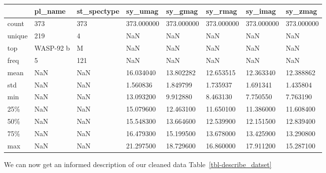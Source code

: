 \documentclass[
  letterpaper,
  DIV=11,
  numbers=noendperiod]{scrartcl}
\begin{document}
\begin{longtable}[]{@{}llllllll@{}}
\toprule\noalign{}
& pl\_name & st\_spectype & sy\_umag & sy\_gmag & sy\_rmag & sy\_imag &
sy\_zmag \\
\midrule\noalign{}
\endhead
\bottomrule\noalign{}
\endlastfoot
count & 373 & 373 & 373.000000 & 373.000000 & 373.000000 & 373.000000 &
373.000000 \\
unique & 219 & 4 & NaN & NaN & NaN & NaN & NaN \\
top & WASP-92 b & M & NaN & NaN & NaN & NaN & NaN \\
freq & 5 & 121 & NaN & NaN & NaN & NaN & NaN \\
mean & NaN & NaN & 16.034040 & 13.802282 & 12.653515 & 12.363340 &
12.388862 \\
std & NaN & NaN & 1.560836 & 1.849799 & 1.735937 & 1.691341 &
1.435804 \\
min & NaN & NaN & 13.093200 & 9.912880 & 8.463130 & 7.750550 &
7.763190 \\
25\% & NaN & NaN & 15.079600 & 12.463100 & 11.650100 & 11.386000 &
11.608400 \\
50\% & NaN & NaN & 15.548300 & 13.664600 & 12.539900 & 12.151500 &
12.839400 \\
75\% & NaN & NaN & 16.479300 & 15.199500 & 13.678000 & 13.425900 &
13.290800 \\
max & NaN & NaN & 21.297500 & 18.729600 & 16.860000 & 17.911200 &
15.287100 \\
\end{longtable}

We can now get an informed description of our cleaned data
Table~\ref{tbl-describe_datset}
\end{document}

